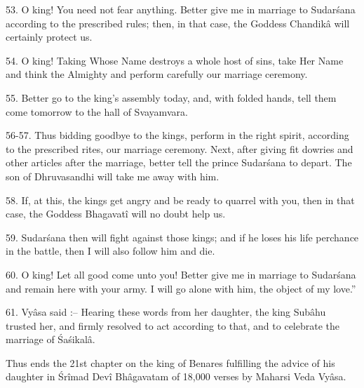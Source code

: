 53. O king! You need not fear anything. Better give me in marriage to Sudar\'sana according to the prescribed rules; then, in that case, the Goddess Chandik\^a will certainly protect us.

54. O king! Taking Whose Name destroys a whole host of sins, take Her Name and think the Almighty and perform carefully our marriage ceremony.

55. Better go to the king's assembly today, and, with folded hands, tell them come tomorrow to the hall of Svayamvara.

56-57. Thus bidding goodbye to the kings, perform in the right spirit, according to the prescribed rites, our marriage ceremony. Next, after giving fit dowries and other articles after the marriage, better tell the prince Sudar\'sana to depart. The son of Dhruvasandhi will take me away with him.

58. If, at this, the kings get angry and be ready to quarrel with you, then in that case, the Goddess Bhagavat\^i will no doubt help us.

59. Sudar\'sana then will fight against those kings; and if he loses his life perchance in the battle, then I will also follow him and die.

60. O king! Let all good come unto you! Better give me in marriage to Sudar\'sana and remain here with your army. I will go alone with him, the object of my love.''

61. Vy\^asa said :-- Hearing these words from her daughter, the king Sub\^ahu trusted her, and firmly resolved to act according to that, and to celebrate the marriage of \'Sa\'sikal\^a.

Thus ends the 21st chapter on the king of Benares fulfilling the advice of his daughter in \'Sr\^imad Dev\^i Bh\^agavatam of 18,000 verses by Maharsi Veda Vy\^asa.